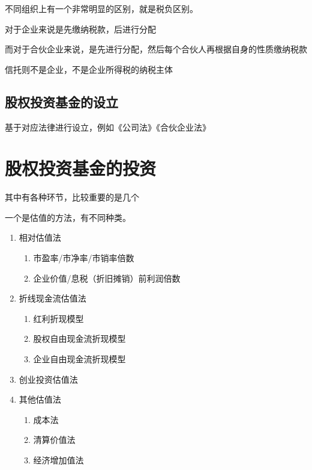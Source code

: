 \documentclass[UTF8,12pt]{ctexbook}
\numberwithin{equation}{section} %
\numberwithin{figure}{section}
\numberwithin{table}{section}
\begin{document}
	不同组织上有一个非常明显的区别，就是税负区别。
	
	对于企业来说是先缴纳税款，后进行分配
	
	而对于合伙企业来说，是先进行分配，然后每个合伙人再根据自身的性质缴纳税款
	
	信托则不是企业，不是企业所得税的纳税主体
	
	\subsection{股权投资基金的设立}
	
	基于对应法律进行设立，例如《公司法》《合伙企业法》
	
	\section{股权投资基金的投资}
	
	其中有各种环节，比较重要的是几个
	
	一个是估值的方法，有不同种类。
	
	\begin{enumerate}
		\item 相对估值法
		\begin{enumerate}
			\item 市盈率/市净率/市销率倍数
			
			\item 企业价值/息税（折旧摊销）前利润倍数
			
		\end{enumerate}
		
		\item 折线现金流估值法
		 \begin{enumerate}
		 	\item 红利折现模型
		 	
		 	\item 股权自由现金流折现模型
		 	
		 	\item 企业自由现金流折现模型
		 \end{enumerate}
		
		\item 创业投资估值法
		
		\item 其他估值法
		\begin{enumerate}
			\item 成本法
			
			\item 清算价值法
			
			\item 经济增加值法
		\end{enumerate}
	\end{enumerate}
	
\end{document}
